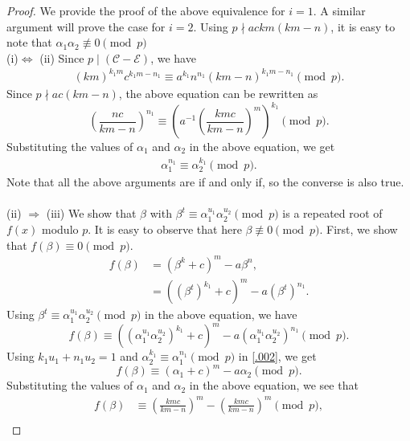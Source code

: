 \documentclass[table]{amsart}
\newcommand{\calC}{\mathcal{C}}
\newcommand{\calE}{\mathcal{E}}
\numberwithin{equation}{section}
\begin{document}
\begin{proof}
	We provide the proof of the above equivalence for $i=1.$ A similar argument will prove the case for $i=2.$ Using $p \nmid ackm(km-n)$, it is easy to note that $\alpha_1 \alpha_2 \not \equiv 0 \pmod{p}$\\
		\noindent (i)$\Leftrightarrow $ (ii) Since $p\mid (\calC-\calE)$, we have
	\begin{align*}
		(km)^{k_1m} c^{k_1m-n_1} \equiv a^{k_1} n^{n_1} (km-n)^{k_1m-n_1} \pmod{p}.
	\end{align*}
	Since $p \nmid ac(km-n)$, the above equation can be rewritten as
	\begin{equation}
		\left( \frac{nc}{km-n} \right)^{n_1} \equiv \left( a^{-1} \left( \frac{kmc}{km-n} \right)^m \right)^{k_1} \pmod{p}.
	\end{equation}
	Substituting the values of $\alpha_1$ and $\alpha_2$ in the above equation, we get
	\begin{align*}
		\alpha_1^{n_1}\equiv\alpha_2^{k_1}\pmod{p}.
	\end{align*}
	Note that all the above arguments are if and only if, so the converse is also true.\\\\
		\noindent  (ii) $\Rightarrow $ (iii)
        We show that $\beta$ with $\beta^t\equiv\alpha_1^{u_1}\alpha_2^{u_2}\pmod {p}$ is a repeated root of $f(x)$ modulo $p.$ It is easy to observe that here $\beta \not\equiv 0 \pmod{p}$.
		First, we show that $f(\beta)\equiv 0\pmod{p}.$
		\begin{align*}
			f(\beta)&=(\beta^k+c)^{m}-a\beta^n,\\
			&=\left((\beta^t)^{k_1}+c\right)^{m} -a(\beta^t)^{n_1}.
		\end{align*}
		Using $\beta^t\equiv \alpha_1^{u_1}\alpha_2^{u_2}\pmod {p}$ in the above equation, we have
		\begin{equation}\label{.002}
            f(\beta)\equiv \left((\alpha_1^{u_1}\alpha_2^{u_2})^{k_1}+c\right)^{m} -a(\alpha_1^{u_1}\alpha_2^{u_2})^{n_1} \pmod{p}.
		\end{equation}
		Using $k_1u_1 + n_1u_2 = 1$ and $\alpha_2^{k_1}\equiv\alpha_1^{n_1}\pmod{p}$ in \eqref{.002}, we get
		\begin{equation*}
			f(\beta) \equiv (\alpha_1+c)^{m} -a \alpha_2\pmod{p}.
		\end{equation*}
		Substituting the values of $\alpha_1$ and $\alpha_2$ in the above equation, we see that
		\begin{align*}
			f(\beta)&\equiv \left(\frac{kmc}{km-n}\right)^m -\left(\frac{kmc}{km-n}\right)^m\pmod{p},\\

\end{align*}
\end{proof}
\end{document}
